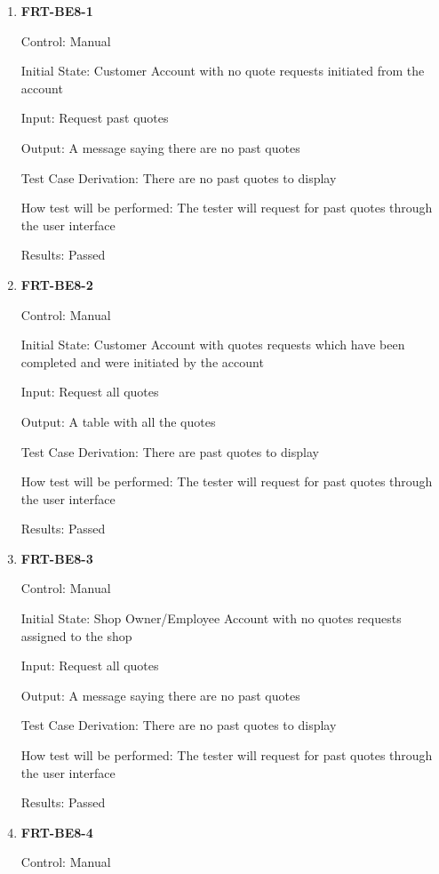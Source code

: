 \documentclass[12pt, titlepage]{article}
\begin{document}
\begin{enumerate}
	\item \textbf{FRT-BE8-1}

	      Control: Manual

	      Initial State: Customer Account with no quote requests initiated from the account

	      Input: Request past quotes

	      Output: A message saying there are no past quotes

	      Test Case Derivation: There are no past quotes to display

	      How test will be performed: The tester will request for past quotes through the user interface

	      Results: Passed

	\item \textbf{FRT-BE8-2}

	      Control: Manual

	      Initial State: Customer Account with quotes requests which have been completed and were initiated
	      by the account

	      Input: Request all quotes

	      Output: A table with all the quotes

	      Test Case Derivation: There are past quotes to display

	      How test will be performed: The tester will request for past quotes through the user interface

	      Results: Passed

	\item \textbf{FRT-BE8-3}

	      Control: Manual

	      Initial State: Shop Owner/Employee Account with no quotes requests assigned to the shop

	      Input: Request all quotes

	      Output: A message saying there are no past quotes

	      Test Case Derivation: There are no past quotes to display

	      How test will be performed: The tester will request for past quotes through the user interface

	      Results: Passed

	\item \textbf{FRT-BE8-4}

	      Control: Manual


\end{enumerate}
\end{document}
